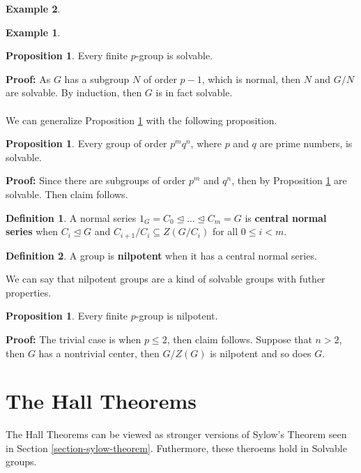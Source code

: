 \documentclass[11pt]{amsbook}%
\theoremstyle{plain}
\theoremstyle{definition}
\newtheorem{definition*}{Definition}
\newtheorem*{example*}{Example}
\newtheorem{proposition}[theorem]{Proposition}
\numberwithin{equation}{section}
\renewcommand{\proof}{ \textbf{Proof: }}
\newcommand{\leftnormal}{\trianglelefteq}
\begin{document}
\begin{example*}
\begin{example*}
\begin{proposition}
  \label{prop-p-solvable}
  Every finite $p$-group is solvable.
\end{proposition} \vspace{1.8em}
\proof As $G$ has a subgroup $N$ of order $p-1$, which is normal, then $N$ and $G/N$ are solvable.
By induction, then $G$ is in fact solvable. \qedsymbol \\ \\
We can generalize Proposition \ref{prop-p-solvable} with the following proposition.
\begin{proposition}
  \label{prop-pq-solvable}
  Every group of order $p^{m}q^{n}$, where $p$ and $q$ are prime numbers, is solvable.
\end{proposition} \vspace{1.8em}
\proof Since there are subgroups of order $p^{m}$ and $q^{n}$, then by Proposition \ref{prop-p-solvable}
are solvable. Then claim follows. \qedsymbol

\begin{definition*}
  A normal series $1_{G} = C_{0} \leftnormal \dots \leftnormal C_{m} = G$ is \textbf{central normal series} when
  $C_{i} \leftnormal G$ and $C_{i+1}/C_{i} \subseteq Z(G/C_{i})$ for all $0 \leq i < m$.
\end{definition*}

\begin{definition*}
  A group is \textbf{nilpotent} when it has a central normal series.
\end{definition*}
We can say that nilpotent groups are a kind of solvable groups with futher properties.

\begin{proposition}
  Every finite $p$-group is nilpotent.
\end{proposition} \vspace{1.8em}
\proof The trivial case is when $p \leq 2$, then claim follows. Suppose that $n > 2$, then
$G$ has a nontrivial center, then $G/Z(G)$ is nilpotent and so does $G$. \qedsymbol



\section{The Hall Theorems}
The Hall Theorems can be viewed as stronger versions of Sylow's Theorem seen in Section \ref{section-sylow-theorem}.
Futhermore, these theroems hold in Solvable groups.


\end{example*}
\end{example*}
\end{document}
